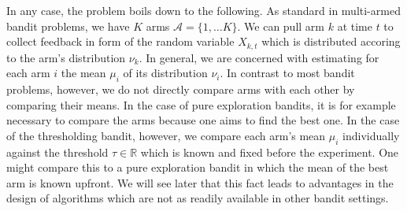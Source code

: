 \documentclass[12pt,]{article}
\begin{document}
In any case, the problem boils down to the following. As standard in
multi-armed bandit problems, we have \(K\) arms
\(\mathcal{A} = \{1, \dots K\}\). We can pull arm \(k\) at time \(t\) to
collect feedback in form of the random variable \(X_{k,t}\) which is
distributed accoring to the arm's distribution \(\nu_k\). In general, we
are concerned with estimating for each arm \(i\) the mean \(\mu_i\) of
its distribution \(\nu_i\). In contrast to most bandit problems,
however, we do not directly compare arms with each other by comparing
their means. In the case of pure exploration bandits, it is for example
necessary to compare the arms because one aims to find the best one. In
the case of the thresholding bandit, however, we compare each arm's mean
\(\mu_i\) individually against the threshold \(\tau \in \mathbb{R}\)
which is known and fixed before the experiment. One might compare this
to a pure exploration bandit in which the mean of the best arm is known
upfront. We will see later that this fact leads to advantages in the
design of algorithms which are not as readily available in other bandit
settings.
\end{document}
